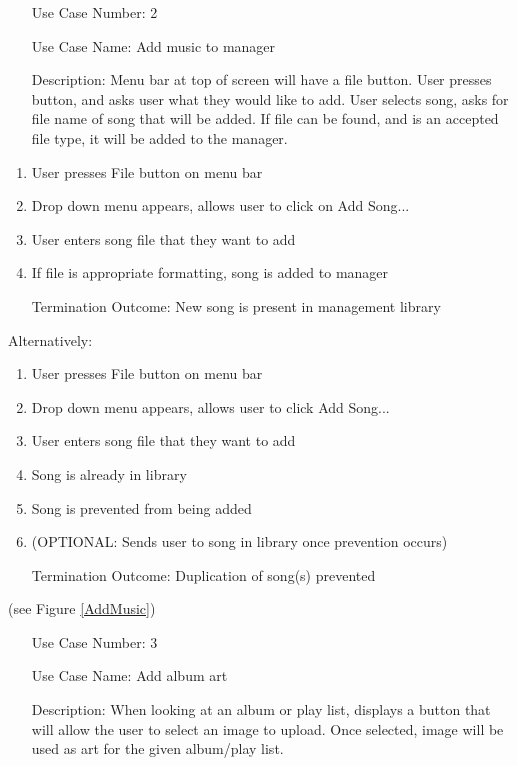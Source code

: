 \documentclass[10pt,conference,onecolumn,compsoc]{IEEEtran}
\begin{document}
\begin{itemize}
\item[Use Case Number:] 2
\item[Use Case Name:] Add music to manager
\item[Description:] Menu bar at top of screen will have a file button. User presses button, and asks user what they would like to add. User selects song, asks for file name of song that will be added. If file can be found, and is an accepted file type, it will be added to the manager.
\end{itemize}

\begin{enumerate}
\item User presses File button on menu bar
\item Drop down menu appears, allows user to click on Add Song...
\item User enters song file that they want to add
\item If file is appropriate formatting, song is added to manager
\item [Termination Outcome:] New song is present in management library
\end{enumerate}

Alternatively:
\begin{enumerate}
\item User presses File button on menu bar
\item Drop down menu appears, allows user to click Add Song...
\item User enters song file that they want to add
\item Song is already in library
\item Song is prevented from being added
\item (OPTIONAL: Sends user to song in library once prevention occurs)
\item [Termination Outcome:] Duplication of song(s) prevented
\end{enumerate}

(see Figure \ref{AddMusic})

\begin{itemize}
\item[Use Case Number:] 3
\item[Use Case Name:] Add album art
\item[Description:] When looking at an album or play list, displays a button that will allow the user to select an image to upload. Once selected, image will be used as art for the given album/play list.
\end{itemize}
\end{document}
